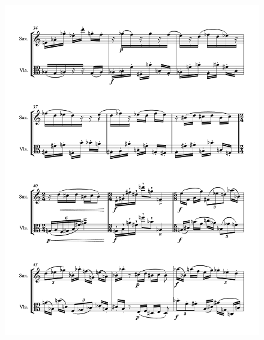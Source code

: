 \begin{figure}[htbp]
    \centering
	\includegraphics[width=6.5in]{figures/Sax_Viola_4.pdf}
\end{figure}

